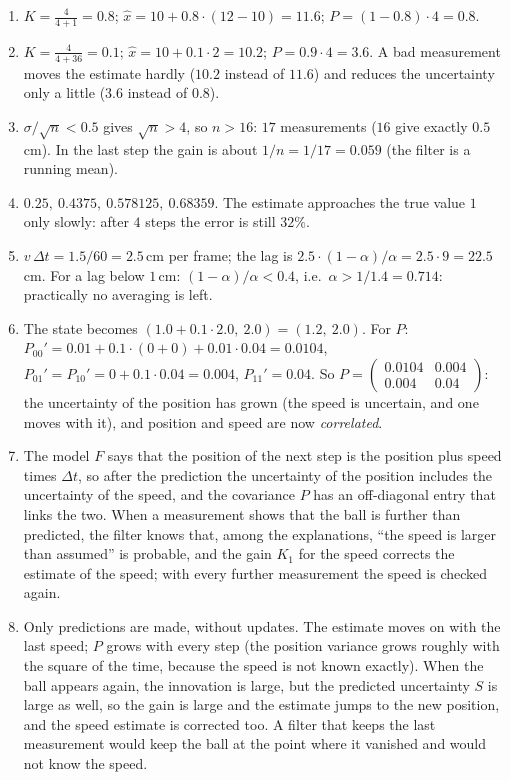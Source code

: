 \begin{enumerate}[label=\textbf{\ansnum.\arabic*}]
  \item $K=\frac{4}{4+1}=0.8$; $\hat x=10+0.8\cdot(12-10)=11.6$; $P=(1-0.8)\cdot4=0.8$.
  \item $K=\frac{4}{4+36}=0.1$; $\hat x=10+0.1\cdot2=10.2$; $P=0.9\cdot4=3.6$. A bad measurement moves the estimate hardly ($10.2$ instead of $11.6$) and reduces the uncertainty only a little ($3.6$ instead of $0.8$).
  \item $\sigma/\sqrt n<0.5$ gives $\sqrt n>4$, so $n>16$: $17$ measurements ($16$ give exactly $0.5$\,cm). In the last step the gain is about $1/n=1/17=0.059$ (the filter is a running mean).
  \item $0.25,\ 0.4375,\ 0.578125,\ 0.68359$. The estimate approaches the true value $1$ only slowly: after $4$ steps the error is still $32\%$.
  \item $v\,\Delta t=1.5/60=2.5$\,cm per frame; the lag is $2.5\cdot(1-\alpha)/\alpha=2.5\cdot9=22.5$\,cm. For a lag below $1$\,cm: $(1-\alpha)/\alpha<0.4$, i.e.\ $\alpha>1/1.4=0.714$: practically no averaging is left.
  \item The state becomes $(1.0+0.1\cdot2.0,\ 2.0)=(1.2,\ 2.0)$. For $P$: $P_{00}'=0.01+0.1\cdot(0+0)+0.01\cdot0.04=0.0104$, $P_{01}'=P_{10}'=0+0.1\cdot0.04=0.004$, $P_{11}'=0.04$. So $P=\begin{pmatrix}0.0104&0.004\\0.004&0.04\end{pmatrix}$: the uncertainty of the position has grown (the speed is uncertain, and one moves with it), and position and speed are now \emph{correlated}.
  \item The model $F$ says that the position of the next step is the position plus speed times $\Delta t$, so after the prediction the uncertainty of the position includes the uncertainty of the speed, and the covariance $P$ has an off-diagonal entry that links the two. When a measurement shows that the ball is further than predicted, the filter knows that, among the explanations, ``the speed is larger than assumed'' is probable, and the gain $K_1$ for the speed corrects the estimate of the speed; with every further measurement the speed is checked again.
  \item Only predictions are made, without updates. The estimate moves on with the last speed; $P$ grows with every step (the position variance grows roughly with the square of the time, because the speed is not known exactly). When the ball appears again, the innovation is large, but the predicted uncertainty $S$ is large as well, so the gain is large and the estimate jumps to the new position, and the speed estimate is corrected too. A filter that keeps the last measurement would keep the ball at the point where it vanished and would not know the speed.

\end{enumerate}
